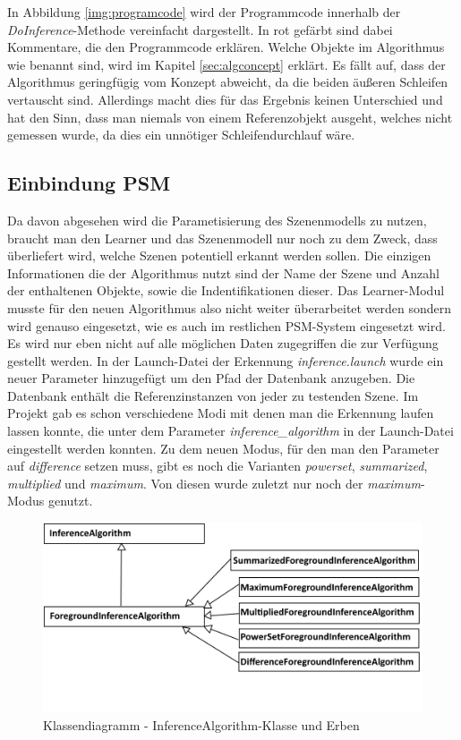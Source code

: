 In Abbildung \ref{img:programcode} wird der Programmcode innerhalb der \textit{DoInference}-Methode vereinfacht dargestellt. In rot gefärbt sind dabei Kommentare, die den Programmcode erklären. Welche Objekte im Algorithmus wie benannt sind, wird im Kapitel \ref{sec:algconcept} erklärt. Es fällt auf, dass der Algorithmus geringfügig vom Konzept abweicht, da die beiden äußeren Schleifen vertauscht sind. Allerdings macht dies für das Ergebnis keinen Unterschied und hat den Sinn, dass man niemals von einem Referenzobjekt ausgeht, welches nicht gemessen wurde, da dies ein unnötiger Schleifendurchlauf wäre.
\subsection{Einbindung PSM}
Da davon abgesehen wird die Parametisierung des Szenenmodells zu nutzen, braucht man den Learner und das Szenenmodell nur noch zu dem Zweck, dass überliefert wird, welche Szenen potentiell erkannt werden sollen. Die einzigen Informationen die der Algorithmus nutzt sind der Name der Szene und Anzahl der enthaltenen Objekte, sowie die Indentifikationen dieser. Das Learner-Modul musste für den neuen Algorithmus also nicht weiter überarbeitet werden sondern wird genauso eingesetzt, wie es auch im restlichen PSM-System eingesetzt wird. Es wird nur eben nicht auf alle möglichen Daten zugegriffen die zur Verfügung gestellt werden.
In der Launch-Datei der Erkennung \textit{inference.launch} wurde ein neuer Parameter hinzugefügt um den Pfad der Datenbank anzugeben. Die Datenbank enthält die Referenzinstanzen von jeder zu testenden Szene. Im Projekt gab es schon verschiedene Modi mit denen man die Erkennung laufen lassen konnte, die unter dem Parameter \textit{inference\_algorithm} in der Launch-Datei eingestellt werden konnten. Zu dem neuen Modus, für den man den Parameter auf \textit{difference} setzen muss, gibt es noch die Varianten \textit{powerset}, \textit{summarized}, \textit{multiplied} und \textit{maximum}. Von diesen wurde zuletzt nur noch der \textit{maximum}-Modus genutzt.\smallskip\\
\begin{figure}
	\centering
	\includegraphics[width=15cm]{bilder/InferenceAlgorithm.pdf}
	\caption{Klassendiagramm - InferenceAlgorithm-Klasse und Erben}
	\label{img:vererbung}
\end{figure}
